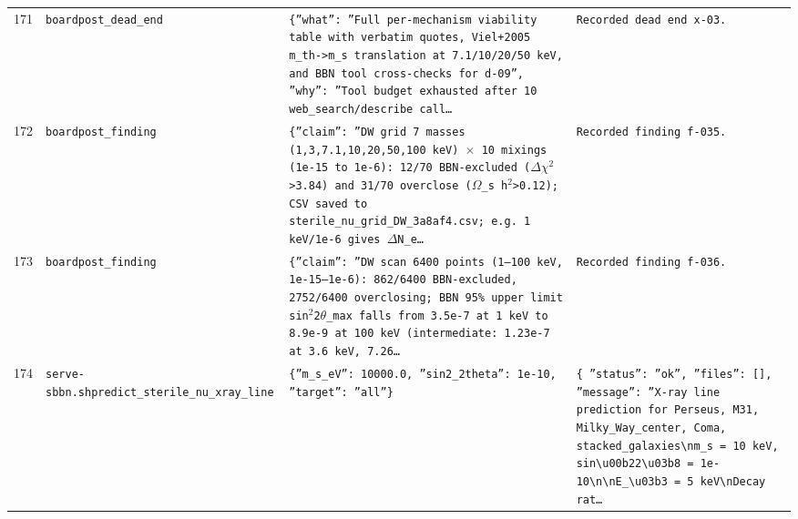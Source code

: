 \documentclass[11pt,a4paper]{article}
\begin{document}
\begin{longtable}{@{}p{}p{}p{}p{}@{}}
171 & \texttt{board}\newline\texttt{post\_\allowbreak{}dead\_\allowbreak{}end} & \texttt{\{''what'':\allowbreak{} ''Full per-mechanism viability table with verbatim quotes,\allowbreak{} Viel+2005 m\_\allowbreak{}th-\textgreater{}\allowbreak{}m\_\allowbreak{}s translation at 7.1/\allowbreak{}10/\allowbreak{}20/\allowbreak{}50 keV,\allowbreak{} and BBN tool cross-checks for d-09'',\allowbreak{} ''why'':\allowbreak{} ''Tool budget exhausted after 10 web\_\allowbreak{}search/\allowbreak{}describe call\ldots{}\allowbreak{}} & \texttt{Recorded dead end x-03.} \\
172 & \texttt{board}\newline\texttt{post\_\allowbreak{}finding} & \texttt{\{''claim'':\allowbreak{} ''DW grid 7 masses (1,\allowbreak{}3,\allowbreak{}7.1,\allowbreak{}10,\allowbreak{}20,\allowbreak{}50,\allowbreak{}100 keV)\allowbreak{} $\times$ 10 mixings (1e-15 to 1e-6)\allowbreak{}:\allowbreak{} 12/\allowbreak{}70 BBN-excluded ($\Delta$$\chi$$^2$\textgreater{}\allowbreak{}3.84)\allowbreak{} and 31/\allowbreak{}70 overclose ($\Omega$\_\allowbreak{}s h$^2$\textgreater{}\allowbreak{}0.12)\allowbreak{};\allowbreak{} CSV saved to sterile\_\allowbreak{}nu\_\allowbreak{}grid\_\allowbreak{}DW\_\allowbreak{}3a8af4.csv;\allowbreak{} e.g. 1 keV/\allowbreak{}1e-6 gives $\Delta$N\_\allowbreak{}e\ldots{}\allowbreak{}} & \texttt{Recorded finding f-035.} \\
173 & \texttt{board}\newline\texttt{post\_\allowbreak{}finding} & \texttt{\{''claim'':\allowbreak{} ''DW scan 6400 points (1--100 keV,\allowbreak{} 1e-15--1e-6)\allowbreak{}:\allowbreak{} 862/\allowbreak{}6400 BBN-excluded,\allowbreak{} 2752/\allowbreak{}6400 overclosing;\allowbreak{} BBN 95\% upper limit sin$^2$2$\theta$\_\allowbreak{}max falls from 3.5e-7 at 1 keV to 8.9e-9 at 100 keV (intermediate:\allowbreak{} 1.23e-7 at 3.6 keV,\allowbreak{} 7.26\ldots{}\allowbreak{}} & \texttt{Recorded finding f-036.} \\
174 & \texttt{serve-sbbn.sh}\newline\texttt{predict\_\allowbreak{}sterile\_\allowbreak{}nu\_\allowbreak{}xray\_\allowbreak{}line} & \texttt{\{''m\_\allowbreak{}s\_\allowbreak{}eV'':\allowbreak{} 10000.0,\allowbreak{} ''sin2\_\allowbreak{}2theta'':\allowbreak{} 1e-10,\allowbreak{} ''target'':\allowbreak{} ''all''\}\allowbreak{}} & \texttt{\{   ''status'':\allowbreak{} ''ok'',\allowbreak{}   ''files'':\allowbreak{} []\allowbreak{},\allowbreak{}   ''message'':\allowbreak{} ''X-ray line prediction for Perseus,\allowbreak{} M31,\allowbreak{} Milky\_\allowbreak{}Way\_\allowbreak{}center,\allowbreak{} Coma,\allowbreak{} stacked\_\allowbreak{}galaxies\textbackslash{}\allowbreak{}nm\_\allowbreak{}s =\allowbreak{} 10 keV,\allowbreak{} sin\textbackslash{}\allowbreak{}u00b22\textbackslash{}\allowbreak{}u03b8 =\allowbreak{} 1e-10\textbackslash{}\allowbreak{}n\textbackslash{}\allowbreak{}nE\_\allowbreak{}\textbackslash{}\allowbreak{}u03b3 =\allowbreak{} 5 keV\textbackslash{}\allowbreak{}nDecay rat\ldots{}\allowbreak{}} \\

\end{longtable}
\end{document}
